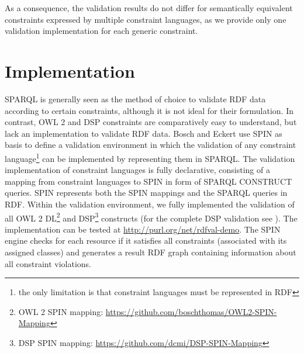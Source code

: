 \documentclass{llncs}
\begin{document}
As a consequence, the validation results do not differ for semantically equivalent constraints expressed by multiple constraint languages,
as we provide only one validation implementation for each generic constraint.


\section{Implementation}
\label{sec:implementation}

SPARQL is generally seen as the method of choice to validate RDF data according to certain constraints, although it is not ideal for their formulation. 
In contrast, OWL 2 and DSP constraints are comparatively easy to understand, but lack an implementation to validate RDF data. 
Bosch and Eckert\cite{BoschEckert2014-2} use SPIN as basis to define a
validation environment in which the validation of any constraint language\footnote{the only limitation is that constraint languages must be represented in RDF} can be implemented by representing them in SPARQL. 
The validation implementation of constraint languages is fully declarative,
consisting of a mapping from constraint languages to SPIN in form of SPARQL CONSTRUCT queries.
SPIN represents both the SPIN mappings and the SPARQL queries in RDF. 
Within the validation environment, we fully implemented the validation of all OWL 2 DL\footnote{OWL 2 SPIN mapping: \url{https://github.com/boschthomas/OWL2-SPIN-Mapping}} and DSP\footnote{DSP SPIN mapping: \url{https://github.com/dcmi/DSP-SPIN-Mapping}} constructs (for the complete DSP validation see \cite{BoschEckert2014-2}). 
The implementation can be tested at \url{http://purl.org/net/rdfval-demo}.
The SPIN engine checks for each resource if it satisfies all constraints (associated with its assigned classes) and generates a result RDF graph containing information about all constraint violations.
\end{document}
